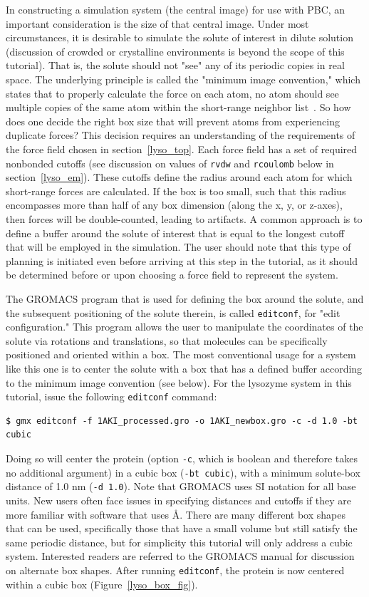 \documentclass[9pt,tutorial,pubversion]{livecoms}
\begin{document}
In constructing a simulation system (the central image) for use with PBC, an important consideration is the size of that central image. Under most circumstances, it is desirable to simulate the solute of interest in dilute solution (discussion of crowded or crystalline environments is beyond the scope of this tutorial). That is, the solute should not "see" any of its periodic copies in real space. The underlying principle is called the "minimum image convention," which states that to properly calculate the force on each atom, no atom should see multiple copies of the same atom within the short-range neighbor list~\cite{Frenkel2001}. So how does one decide the right box size that will prevent atoms from experiencing duplicate forces? This decision requires an understanding of the requirements of the force field chosen in section~\ref{lyso_top}. Each force field has a set of required nonbonded cutoffs (see discussion on values of \texttt{rvdw} and \texttt{rcoulomb} below in section~\ref{lyso_em}). These cutoffs define the radius around each atom for which short-range forces are calculated. If the box is too small, such that this radius encompasses more than half of any box dimension (along the x, y, or z-axes), then forces will be double-counted, leading to artifacts. A common approach is to define a buffer around the solute of interest that is equal to the longest cutoff that will be employed in the simulation. The user should note that this type of planning is initiated even before arriving at this step in the tutorial, as it should be determined before or upon choosing a force field to represent the system.

The GROMACS program that is used for defining the box around the solute, and the subsequent positioning of the solute therein, is called \texttt{editconf}, for "edit configuration." This program allows the user to manipulate the coordinates of the solute via rotations and translations, so that molecules can be specifically positioned and oriented within a box. The most conventional usage for a system like this one is to center the solute with a box that has a defined buffer according to the minimum image convention (see below). For the lysozyme system in this tutorial, issue the following \texttt{editconf} command:

\begin{lstlisting}
$ gmx editconf -f 1AKI_processed.gro -o 1AKI_newbox.gro -c -d 1.0 -bt cubic
\end{lstlisting}
%
Doing so will center the protein (option \texttt{-c}, which is boolean and therefore takes no additional argument) in a cubic box (\texttt{-bt cubic}), with a minimum solute-box distance of 1.0 nm (\texttt{-d 1.0}). Note that GROMACS uses SI notation for all base units. New users often face issues in specifying distances and cutoffs if they are more familiar with software that uses \AA. There are many different box shapes that can be used, specifically those that have a small volume but still satisfy the same periodic distance, but for simplicity this tutorial will only address a cubic system. Interested readers are referred to the GROMACS manual for discussion on alternate box shapes. After running \texttt{editconf}, the protein is now centered within a cubic box (Figure~\ref{lyso_box_fig}).
\end{document}
